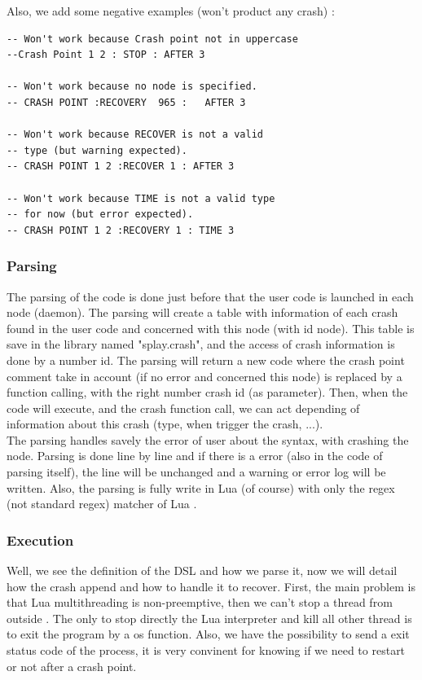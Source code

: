 \documentclass{eplmastersthesis}
\begin{document}
        Also, we add some negative examples (won't product any crash) :

        \begin{lstlisting}[style=MyLua]
-- Won't work because Crash point not in uppercase
--Crash Point 1 2 : STOP : AFTER 3

-- Won't work because no node is specified.
-- CRASH POINT :RECOVERY  965 :   AFTER 3

-- Won't work because RECOVER is not a valid
-- type (but warning expected).
-- CRASH POINT 1 2 :RECOVER 1 : AFTER 3

-- Won't work because TIME is not a valid type
-- for now (but error expected).
-- CRASH POINT 1 2 :RECOVERY 1 : TIME 3
        \end{lstlisting}

        \subsubsection{Parsing}

        The parsing of the code is done just before that the user code is launched in each node (daemon). The parsing will
        create a table with information of each crash found in the user code and concerned with this node (with id node).
        This table is save in the library named "splay.crash", and the access of crash information is done by a number id.
        The parsing will return a new code where the crash point comment take in account (if no error and concerned this node)
        is replaced by a function calling, with the right number crash id (as parameter). Then, when the code will execute,
        and the crash function call, we can act depending of information about this crash (type, when trigger the crash, ...).\\

        The parsing handles savely the error of user about the syntax, with crashing the node. Parsing is done
        line by line and if there is a error (also in the code of parsing itself), the line will be unchanged and
        a warning or error log will be written. Also, the parsing is fully write in Lua (of course) with only
        the regex (not standard regex) matcher of Lua \cite{RegexLua}.

        \subsubsection{Execution}

        Well, we see the definition of the DSL and how we parse it, now we will detail how the crash append and how
        to handle it to recover. First, the main problem is that Lua multithreading is non-preemptive, then we can't
        stop a thread from outside \cite{CoroutineLua}. The only to stop directly the Lua interpreter and kill all other
        thread is to exit the program by a os function. Also, we have the possibility to send a exit status code of the
        process, it is very convinent for knowing if we need to restart or not after a crash point. \\
\end{document}

